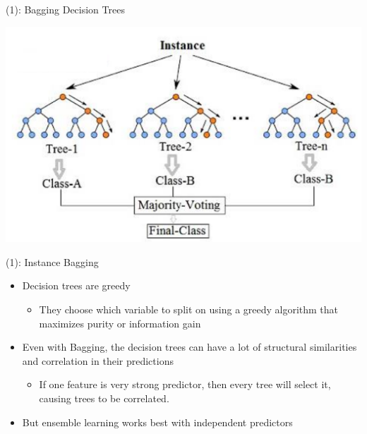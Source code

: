 \begin{frame}[allowframebreaks]{(1): Bagging Decision Trees}
    \begin{center}
        \includegraphics[width=0.95\linewidth]{images/decision-trees/decision-trees-14.png}
    \end{center}
\end{frame}

\begin{frame}[allowframebreaks]{(1): Instance Bagging}
\begin{itemize}
    \item Decision trees are greedy
    \begin{itemize}
        \item They choose which variable to split on using a greedy algorithm that maximizes purity or information gain
    \end{itemize}
    \item Even with Bagging, the decision trees can have a lot of structural similarities and correlation in their predictions
    \begin{itemize}
        \item If one feature is very strong predictor, then every tree will select it, causing trees to be correlated.
    \end{itemize}
    \item But ensemble learning works best with independent predictors
\end{itemize}
\end{frame}

